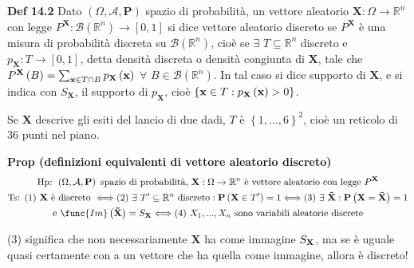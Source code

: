 \documentclass{article}
\begin{document}
\textbf{Def 14.2} Dato $\left( \Omega ,\mathcal{A},\mathbf{P}\right) $
spazio di probabilit\`{a}, un vettore aleatorio $\mathbf{X}:\Omega
\rightarrow 
\mathbb{R}
^{n}$ con legge $P^{\mathbf{X}}:\mathcal{B}\left( 
\mathbb{R}
^{n}\right) \rightarrow \left[ 0,1\right] $ si dice vettore aleatorio
discreto se $P^{\mathbf{X}}$ \`{e} una misura di probabilit\`{a} discreta su 
$\mathcal{B}\left( 
\mathbb{R}
^{n}\right) $, cio\`{e} se $\exists $ $T\subseteq 
\mathbb{R}
^{n}$ discreto e $p_{\mathbf{X}}:T\rightarrow \left[ 0,1\right] $, detta
densit\`{a} discreta o densit\`{a} congiunta di $\mathbf{X}$, tale che $P^{%
\mathbf{X}}\left( B\right) =\sum_{\mathbf{x}\in T\cap B}p_{\mathbf{X}}\left( 
\mathbf{x}\right) $ $\forall $ $B\in \mathcal{B}\left( 
\mathbb{R}
^{n}\right) $. In tal caso si dice supporto di $\mathbf{X}$, e si indica con 
$S_{\mathbf{X}}$, il supporto di $p_{\mathbf{X}}$, cio\`{e} $\left\{ \mathbf{%
x}\in T:p_{\mathbf{X}}\left( \mathbf{x}\right) >0\right\} $.

Se $\mathbf{X}$ descrive gli esiti del lancio di due dadi, $T$ \`{e} $%
\left\{ 1,...,6\right\} ^{2}$, cio\`{e} un reticolo di $36$ punti nel piano.

\textbf{Prop (definizioni equivalenti di vettore aleatorio discreto)}%
\begin{gather*}
\text{Hp: }\left( \Omega ,\mathcal{A},\mathbf{P}\right) \text{ spazio di
probabilit\`{a}, }\mathbf{X}:\Omega \rightarrow 
\mathbb{R}
^{n}\text{ \`{e} vettore aleatorio con legge }P^{\mathbf{X}} \\
\text{Ts: (1) }\mathbf{X}\text{ \`{e} discreto }\Longleftrightarrow \text{%
(2) }\exists \text{ }T^{\prime }\subseteq 
\mathbb{R}
^{n}\text{ discreto}:\mathbf{P}\left( \mathbf{X}\in T^{\prime }\right)
=1\Longleftrightarrow \text{(3) }\exists \text{ }\mathbf{\tilde{X}:P}\left( 
\mathbf{X}=\mathbf{\tilde{X}}\right) =1 \\
\text{e }\func{Im}\left( \mathbf{\tilde{X}}\right) =S_{\mathbf{X}%
}\Longleftrightarrow \text{(4) }X_{1},...,X_{n}\text{ sono variabili
aleatorie discrete}
\end{gather*}

(3) significa che non necessariamente $\mathbf{X}$ ha come immagine $S_{%
\mathbf{X}}$, ma se \`{e} uguale quasi certamente con a un vettore che ha
quella come immagine, allora \`{e} discreto!
\end{document}
